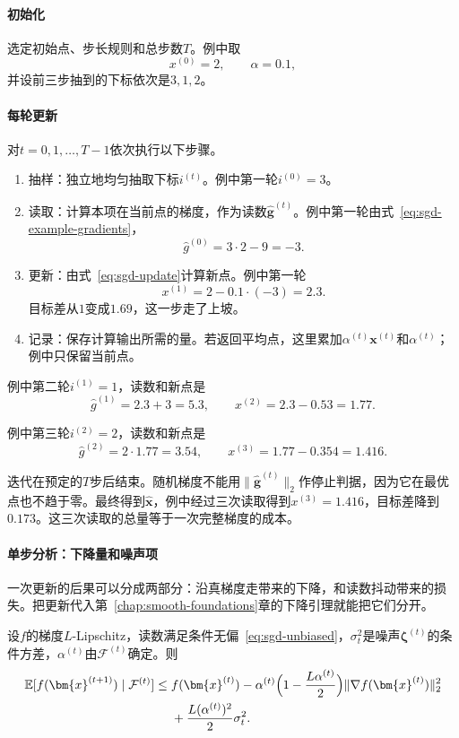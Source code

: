 \paragraph{初始化}
选定初始点、步长规则和总步数$T$。例中取
\[
 x^{(0)}=2,\qquad \alpha=0.1,
\]
并设前三步抽到的下标依次是$3,1,2$。

\paragraph{每轮更新}
对$t=0,1,\ldots,T-1$依次执行以下步骤。

\begin{enumerate}
 \item 抽样：独立地均匀抽取下标$i^{(t)}$。例中第一轮$i^{(0)}=3$。
 \item 读取：计算本项在当前点的梯度，作为读数$\hat{\bm{g}}^{(t)}$。例中第一轮由式~\eqref{eq:sgd-example-gradients}，
 \[
  \hat{g}^{(0)}=3\cdot2-9=-3.
 \]
 \item 更新：由式~\eqref{eq:sgd-update}计算新点。例中第一轮
 \[
  x^{(1)}=2-0.1\cdot(-3)=2.3.
 \]
 目标差从$1$变成$1.69$，这一步走了上坡。
 \item 记录：保存计算输出所需的量。若返回平均点，这里累加$\alpha^{(t)}\bm{x}^{(t)}$和$\alpha^{(t)}$；例中只保留当前点。
\end{enumerate}

例中第二轮$i^{(1)}=1$，读数和新点是
\[
 \hat{g}^{(1)}=2.3+3=5.3,\qquad x^{(2)}=2.3-0.53=1.77.
\]

例中第三轮$i^{(2)}=2$，读数和新点是
\[
 \hat{g}^{(2)}=2\cdot1.77=3.54,\qquad x^{(3)}=1.77-0.354=1.416.
\]

迭代在预定的$T$步后结束。随机梯度不能用$\lVert\hat{\bm{g}}^{(t)}\rVert_2$作停止判据，因为它在最优点也不趋于零。最终得到$\hat{\bm{x}}$，例中经过三次读取得到$x^{(3)}=1.416$，目标差降到$0.173$。这三次读取的总量等于一次完整梯度的成本。

\paragraph{单步分析：下降量和噪声项}
一次更新的后果可以分成两部分：沿真梯度走带来的下降，和读数抖动带来的损失。把更新代入第~\ref{chap:smooth-foundations}章的下降引理就能把它们分开。

\begin{theorem}[单步期望进展]
\label{thm:sgd-one-step}
设$f$的梯度$L$-Lipschitz，读数满足条件无偏~\eqref{eq:sgd-unbiased}，$\sigma_t^2$是噪声$\bm{\zeta}^{(t)}$的条件方差，$\alpha^{(t)}$由$\mathcal{F}^{(t)}$确定。则
\begin{equation}
 \begin{aligned}
 \mathbb{E}[f(\bm{x}^{(t+1)})\mid\mathcal{F}^{(t)}]
 \leq{}&f(\bm{x}^{(t)})-\alpha^{(t)}\Bigl(1-\frac{L\alpha^{(t)}}{2}\Bigr)\lVert\nabla f(\bm{x}^{(t)})\rVert_2^2\\
 &+\frac{L(\alpha^{(t)})^2}{2}\sigma_t^2.
 \end{aligned}
 \label{eq:sgd-one-step}
\end{equation}
\end{theorem}

